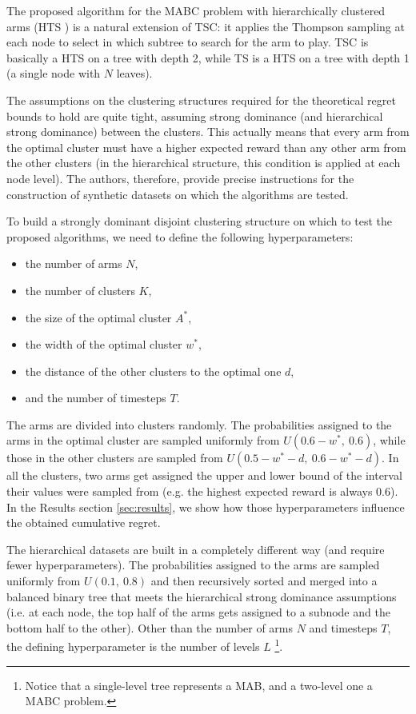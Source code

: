 The proposed algorithm for the MABC problem with hierarchically clustered arms (HTS \cite{bandits}) is a natural extension of TSC: it applies the Thompson sampling at each node to select in which subtree to search for the arm to play. TSC is basically a HTS on a tree with depth 2, while TS is a HTS on a tree with depth 1 (a single node with $N$ leaves).

The assumptions on the clustering structures required for the theoretical regret bounds to hold are quite tight, assuming strong dominance (and hierarchical strong dominance) between the clusters. This actually means that every arm from the optimal cluster must have a higher expected reward than any other arm from the other clusters (in the hierarchical structure, this condition is applied at each node level). The authors, therefore, provide precise instructions for the construction of synthetic datasets on which the algorithms are tested.

To build a strongly dominant disjoint clustering structure on which to test the proposed algorithms, we need to define the following hyperparameters:

\begin{itemize}
  \item the number of arms $N$,
  \item the number of clusters $K$,
  \item the size of the optimal cluster $A^*$,
  \item the width of the optimal cluster $w^*$,
  \item the distance of the other clusters to the optimal one $d$,
  \item and the number of timesteps $T$.
\end{itemize}

The arms are divided into clusters randomly. The probabilities assigned to the arms in the optimal cluster are sampled uniformly from $U(0.6 - w^*,\ 0.6)$, while those in the other clusters are sampled from $U(0.5 - w^* - d,\ 0.6 - w^* - d)$. In all the clusters, two arms get assigned the upper and lower bound of the interval their values were sampled from (e.g. the highest expected reward is always 0.6). In the Results section \ref{sec:results}, we show how those hyperparameters influence the obtained cumulative regret. 

The hierarchical datasets are built in a completely different way (and require fewer hyperparameters). The probabilities assigned to the arms are sampled uniformly from $U(0.1,\ 0.8)$ and then recursively sorted and merged into a balanced binary tree that meets the hierarchical strong dominance assumptions (i.e. at each node, the top half of the arms gets assigned to a subnode and the bottom half to the other). Other than the number of arms $N$ and timesteps $T$, the defining hyperparameter is the number of levels $L$ \footnote{Notice that a single-level tree represents a MAB, and a two-level one a MABC problem.}.

